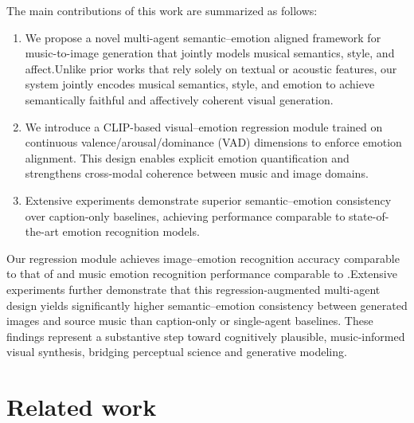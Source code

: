\documentclass[letterpaper]{article}
\begin{document}
The main contributions of this work are summarized as follows:
\begin{enumerate}
    \item We propose a novel multi-agent semantic–emotion aligned framework for music-to-image generation that jointly models musical semantics, style, and affect.Unlike prior works that rely solely on textual or acoustic features, our system jointly encodes musical semantics, style, and emotion to achieve semantically faithful and affectively coherent visual generation.
    \item We introduce a CLIP-based visual–emotion regression module trained on 
continuous valence\-/arousal\-/dominance (VAD) dimensions to enforce emotion alignment. 
This design enables explicit emotion quantification and strengthens cross-modal coherence 
between music and image domains.
    \item Extensive experiments demonstrate superior semantic–emotion consistency over caption-only baselines, achieving performance comparable to state-of-the-art emotion recognition models.
\end{enumerate}

Our regression module achieves image–emotion recognition accuracy comparable to that of \cite{zhao2020emotion}and music emotion recognition performance comparable to \cite{kang2025unified}.Extensive experiments further demonstrate that this regression-augmented multi-agent design yields significantly higher semantic–emotion consistency between generated images and source music than caption-only or single-agent baselines. These findings represent a substantive step toward cognitively plausible, music-informed visual synthesis, bridging perceptual science and generative modeling.

\section{Related work}
\end{document}
